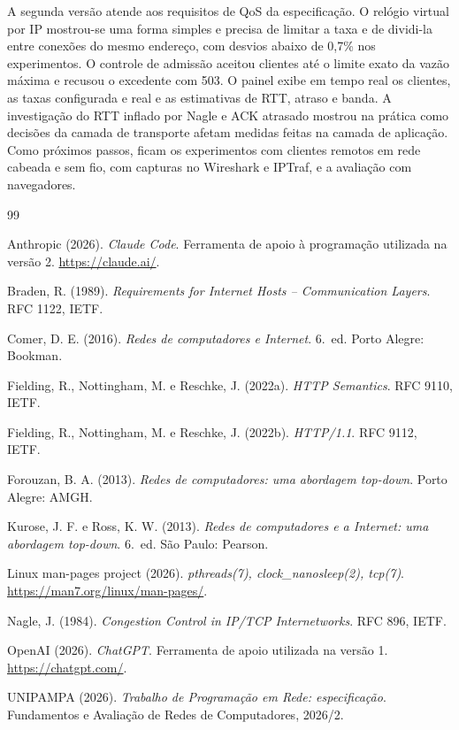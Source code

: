 \documentclass[12pt,a4paper]{article}
\begin{document}
A segunda versão atende aos requisitos de QoS da especificação. O relógio virtual por IP
mostrou-se uma forma simples e precisa de limitar a taxa e de dividi-la entre conexões
do mesmo endereço, com desvios abaixo de 0,7\% nos experimentos. O controle de admissão
aceitou clientes até o limite exato da vazão máxima e recusou o excedente com 503. O painel
exibe em tempo real os clientes, as taxas configurada e real e as estimativas de RTT,
atraso e banda. A investigação do RTT inflado por Nagle e ACK atrasado mostrou na prática
como decisões da camada de transporte afetam medidas feitas na camada de aplicação. Como
próximos passos, ficam os experimentos com clientes remotos em rede cabeada e sem fio, com
capturas no Wireshark e IPTraf, e a avaliação com navegadores.

\begin{thebibliography}{99}
\setlength{\itemsep}{2pt}
\makeatletter\renewcommand{\@biblabel}[1]{}\makeatother
\setlength{\leftskip}{0.5cm}\setlength{\itemindent}{-0.5cm}

 Anthropic (2026). \textit{Claude Code}. Ferramenta de apoio à programação utilizada na versão 2. \url{https://claude.ai/}.

 Braden, R. (1989). \textit{Requirements for Internet Hosts -- Communication Layers}. RFC 1122, IETF.

 Comer, D. E. (2016). \textit{Redes de computadores e Internet}. 6.~ed. Porto Alegre: Bookman.

 Fielding, R., Nottingham, M. e Reschke, J. (2022a). \textit{HTTP Semantics}. RFC 9110, IETF.

 Fielding, R., Nottingham, M. e Reschke, J. (2022b). \textit{HTTP/1.1}. RFC 9112, IETF.

 Forouzan, B. A. (2013). \textit{Redes de computadores: uma abordagem top-down}. Porto Alegre: AMGH.

 Kurose, J. F. e Ross, K. W. (2013). \textit{Redes de computadores e a Internet: uma abordagem top-down}. 6.~ed. São Paulo: Pearson.

 Linux man-pages project (2026). \textit{pthreads(7), clock\_nanosleep(2), tcp(7)}. \url{https://man7.org/linux/man-pages/}.

 Nagle, J. (1984). \textit{Congestion Control in IP/TCP Internetworks}. RFC 896, IETF.

 OpenAI (2026). \textit{ChatGPT}. Ferramenta de apoio utilizada na versão 1. \url{https://chatgpt.com/}.

 UNIPAMPA (2026). \textit{Trabalho de Programação em Rede: especificação}. Fundamentos e Avaliação de Redes de Computadores, 2026/2.
\end{thebibliography}
\end{document}
